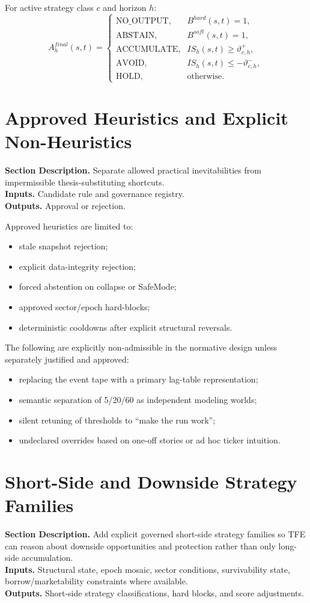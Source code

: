 \documentclass[11pt]{report}
\newcommand{\meta}[3]{\textbf{Section Description.} #1\\
\textbf{Inputs.} #2\\
\textbf{Outputs.} #3\par}
\begin{document}
For active strategy class $c$ and horizon $h$:
\[
A_h^{final}(s,t)=
\begin{cases}
\text{NO\_OUTPUT}, & B^{hard}(s,t)=1,\\
\text{ABSTAIN}, & B^{soft}(s,t)=1,\\
\text{ACCUMULATE}, & IS_h(s,t)\ge \vartheta_{c,h}^{+},\\
\text{AVOID}, & IS_h(s,t)\le -\vartheta_{c,h}^{-},\\
\text{HOLD}, & \text{otherwise.}
\end{cases}
\]

\section{Approved Heuristics and Explicit Non-Heuristics}
\meta{Separate allowed practical inevitabilities from impermissible thesis-substituting shortcuts.}{Candidate rule and governance registry.}{Approval or rejection.}

Approved heuristics are limited to:
\begin{itemize}
\item stale snapshot rejection;
\item explicit data-integrity rejection;
\item forced abstention on collapse or SafeMode;
\item approved sector/epoch hard-blocks;
\item deterministic cooldowns after explicit structural reversals.
\end{itemize}

The following are explicitly non-admissible in the normative design unless separately justified and approved:
\begin{itemize}
\item replacing the event tape with a primary lag-table representation;
\item semantic separation of 5/20/60 as independent modeling worlds;
\item silent retuning of thresholds to ``make the run work'';
\item undeclared overrides based on one-off stories or ad hoc ticker intuition.
\end{itemize}



\section{Short-Side and Downside Strategy Families}
\meta{Add explicit governed short-side strategy families so TFE can reason about downside opportunities and protection rather than only long-side accumulation.}{Structural state, epoch mosaic, sector conditions, survivability state, borrow/marketability constraints where available.}{Short-side strategy classifications, hard blocks, and score adjustments.}
\end{document}
